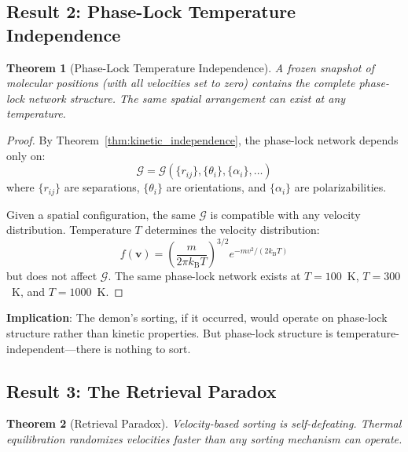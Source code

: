 \documentclass[twocolumn,showpacs,preprintnumbers,amsmath,amssymb,prd]{revtex4-2}
\newtheorem{theorem}{Theorem}[section]
\theoremstyle{definition}
\theoremstyle{remark}
\newcommand{\kB}{k_{\mathrm{B}}}
\newcommand{\phaselockgraph}{\mathcal{G}}
\begin{document}
\subsection{Result 2: Phase-Lock Temperature Independence}

\begin{theorem}[Phase-Lock Temperature Independence]
\label{thm:temperature_independence}
A frozen snapshot of molecular positions (with all velocities set to zero) contains the complete phase-lock network structure. The same spatial arrangement can exist at any temperature.
\end{theorem}

\begin{proof}
By Theorem~\ref{thm:kinetic_independence}, the phase-lock network depends only on:
\begin{equation}
\phaselockgraph = \phaselockgraph(\{r_{ij}\}, \{\theta_i\}, \{\alpha_i\}, \ldots)
\end{equation}
where $\{r_{ij}\}$ are separations, $\{\theta_i\}$ are orientations, and $\{\alpha_i\}$ are polarizabilities.

Given a spatial configuration, the same $\phaselockgraph$ is compatible with any velocity distribution. Temperature $T$ determines the velocity distribution:
\begin{equation}
f(\mathbf{v}) = \left(\frac{m}{2\pi \kB T}\right)^{3/2} e^{-m v^2/(2\kB T)}
\end{equation}
but does not affect $\phaselockgraph$. The same phase-lock network exists at $T = 100$~K, $T = 300$~K, and $T = 1000$~K.
\end{proof}

\textbf{Implication}: The demon's sorting, if it occurred, would operate on phase-lock structure rather than kinetic properties. But phase-lock structure is temperature-independent---there is nothing to sort.

\subsection{Result 3: The Retrieval Paradox}

\begin{theorem}[Retrieval Paradox]
\label{thm:retrieval}
Velocity-based sorting is self-defeating. Thermal equilibration randomizes velocities faster than any sorting mechanism can operate.
\end{theorem}
\end{document}
